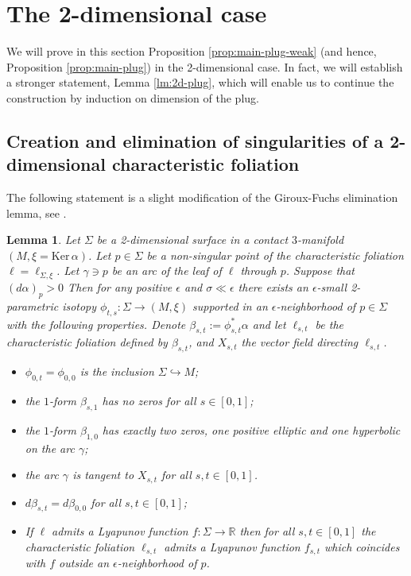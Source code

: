 \documentclass[12pt]{amsart}
\theoremstyle{plain}
\newtheorem{lemma}[theorem]{Lemma}
\theoremstyle{definition}
\theoremstyle{remark}
\newcommand{\R}{\mathbb{R}}
\newcommand{\eps}{\epsilon}
\newcommand{\Ker}{\mathrm{Ker\,}}
\begin{document}
  \section{The 2-dimensional case}\label{sec:2d-plug}
We will prove in this section Proposition \ref{prop:main-plug-weak} (and hence,  Proposition \ref{prop:main-plug}) in the 2-dimensional case. In fact, we will establish a stronger statement, Lemma \ref{lm:2d-plug}, which will enable us to continue the construction by induction on dimension of the plug.

 \subsection{Creation and elimination of singularities of  a 2-dimensional characteristic foliation}\label{sec:GF}
 
The following statement is a slight modification of  the  Giroux-Fuchs elimination lemma, see \cite{Gi}.
 
 \begin{lemma} \label{lm:creation-elimination}
 Let $\Sigma$ be a 2-dimensional surface in a contact $3$-manifold $ (M,\xi=\Ker\alpha)$.
 Let $p\in\Sigma $ be a non-singular point of the characteristic foliation $\ell=\ell_{\Sigma,\xi}$. Let $\gamma\ni p$ be an arc of the leaf of $\ell$ through $p$.   Suppose that $(d\alpha)_p>0$
Then for any positive  $\eps$ and $\sigma\ll \eps$ there exists an $\eps$-small 2-parametric  isotopy $\phi_{t,s}:\Sigma\to (M,\xi)$ supported in an $\eps$-neighborhood of $p\in\Sigma$ with the following properties. Denote $\beta_{s,t}:=\phi_{s,t}^*\alpha$ and let $\ell_{s,t}$ be the characteristic foliation defined by $\beta_{s,t}$, and $X_{s,t}$ the vector field directing $\ell_{s,t}$.
 \begin{itemize} 
 \item[-] $\phi_{0,t}=\phi_{0,0}$ is the inclusion $\Sigma\hookrightarrow M$;
 \item[-] the $1$-form $\beta_{s,1}$ has  no zeros for all $s\in[0,1]$;
 \item[-] the $1$-form $\beta_{1,0}$ has exactly two zeros, one positive elliptic and one hyperbolic on the arc $\gamma$;
 \item[-] the arc $\gamma$  is tangent to $X_{s,t}$ for all $s,t\in[0,1]$.
 \item[-] $d\beta_{s,t}=d\beta_{0,0}$ for all $s,t\in[0,1]$;
 \item[-] If $\ell$ admits a Lyapunov function $f:\Sigma\to\R$ then for all $s,t\in[0,1]$  the characteristic foliation $\ell_{s,t}$    admits a Lyapunov function  $f_{s,t}$ which coincides with $f$ outside an $\eps$-neighborhood of $p$.
 \end{itemize}
 \end{lemma}
 
\end{document}
